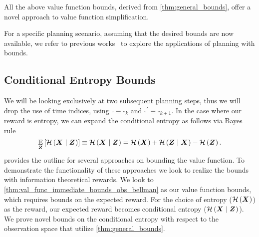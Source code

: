 All the above value function bounds, derived from \cref{thm:general_bounds}, offer a novel approach to value function simplification.

For a specific planning scenario, assuming that the desired bounds are now available, we refer to previous works~\cite{Sztyglic22iros,Barenboim22ijcai} to explore the applications of planning with bounds.


\subsection{Conditional Entropy Bounds}\label{sec:cond_ent_bounds}
We will be looking exclusively at two subsequent planning steps, thus we will drop the use of time indices, using $\square\equiv\square_k$ and $\square^\prime\equiv\square_{k+1}$.
In the case where our reward is entropy, we can expand the conditional entropy as follows via Bayes rule
\begin{equation}
		\operatorname*{\mathbb{E}}\limits_{\boldsymbol Z_{}}\left[{\mathcal{H}\left({\boldsymbol X_{}}\mid{\ensuremath{\boldsymbol Z_{}}}\right)}\right]\equiv\mathcal{H}\left({\boldsymbol X_{}}\mid{\ensuremath{\boldsymbol Z_{}}}\right)=\mathcal{H}\left({\boldsymbol X_{}}\right)+\mathcal{H}\left({\boldsymbol Z_{}}\mid{\ensuremath{\boldsymbol X_{}}}\right)-\mathcal{H}\left({\boldsymbol Z_{}}\right).\label{eq:bayes_entropy}
\end{equation}
 provides the outline for several approaches on bounding the value function. To demonstrate the functionality of these approaches we look to realize the bounds with information theoretical rewards. We look to \cref{thm:val_func_immediate_bounds_obs_bellman} as our value function bounds, which requires bounds on the expected reward. For the choice of entropy ($\mathcal{H}\left({\boldsymbol X_{}}\right)$) as the reward, our expected reward becomes conditional entropy ($\mathcal{H}\left({\boldsymbol X_{}}\mid{\ensuremath{\boldsymbol Z_{}}}\right)$). We prove novel bounds on the conditional entropy with respect to the observation space that utilize \cref{thm:general_bounds}.

